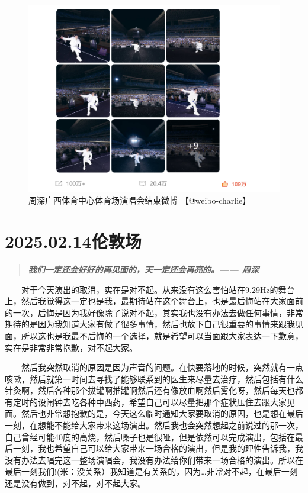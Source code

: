 \documentclass[]{ctexbook}
\begin{document}
\begin{figure}

{\centering \includegraphics[width=400pt]{img/weibo/nanning-20241207-2} 

}

\caption{周深广西体育中心体育场演唱会结束微博 【@weibo-charlie】}\label{fig:unnamed-chunk-169}
\end{figure}

\chapter{2025.02.14伦敦场}\label{London-20250214}

\begin{quote}
\textbf{\emph{我们一定还会好好的再见面的，天一定还会再亮的。------ 周深}}
\end{quote}

  对于今天演出的取消，实在是对不起。从来没有这么害怕站在9.29Hz的舞台上，然后我觉得这一定也是我，最期待站在这个舞台上，也是最后悔站在大家面前的一次，后悔是因为我好像除了说对不起，其实我也没有办法去做任何事情，非常期待的是因为我知道大家有做了很多事情，然后也放下自己很重要的事情来跟我见面，所以这也是我最不后悔的一个选择，就是希望可以当面跟大家表达一下歉意，实在是非常非常抱歉，对不起大家。

  然后我突然取消的原因是因为声音的问题。在快要落地的时候，突然就有一点咳嗽，然后就第一时间去寻找了能够联系到的医生来尽量去治疗，然后包括有什么针灸啊，然后各种那个拔罐啊推罐啊然后还有像放血啊然后雾化呀，然后每天也都有定时的设闹钟去吃各种中西药，希望自己可以尽量把那个症状压住去跟大家见面。然后也非常想抱歉的是，今天这么临时通知大家要取消的原因，也是想在最后一刻，在想能不能给大家带来这场演出。然后我也会突然想起之前说过的那一次，自己曾经可能40度的高烧，然后嗓子也是很哑，但是依然可以完成演出，包括在最后一刻，我也希望自己可以给大家带来一场合格的演出，但是我的理性告诉我，我没有办法去唱完这一整场演唱会，我没有办法给你们带来一场合格的演出。所以在最后一刻我们!(米：没关系）我知道是有关系的，因为\ldots 非常对不起，在最后一刻还是没有做到，对不起，对不起大家。
\end{document}
